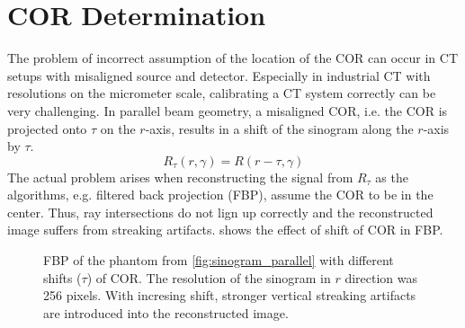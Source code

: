 \documentclass[10pt,journal,compsoc]{IEEEtran}
\begin{document}
\section{COR Determination}
The problem of incorrect assumption of the location of the COR can occur in CT setups with misaligned source and detector.
Especially in industrial CT with resolutions on the micrometer scale, calibrating a CT system correctly can be very challenging.
In parallel beam geometry, a misaligned COR, i.e. the COR is projected onto $\tau$ on the $r$-axis, results in a shift of the sinogram along the $r$-axis by $\tau$.
\begin{equation}
\label{eq:radonoffset}
R_\tau(r,\gamma) = R(r-\tau,\gamma)
\end{equation}
The actual problem arises when reconstructing the signal from $R_\tau$ as the algorithms, e.g. filtered back projection (FBP), assume the COR to be in the center.
Thus, ray intersections do not lign up correctly and the reconstructed image suffers from streaking artifacts.
 shows the effect of shift of COR in FBP.
%
\begin{figure}[!h]
\centering
{}
\hfil
{}
\hfil
{}
\hfil
{}
\caption{
FBP of the phantom from \cref{fig:sinogram_parallel} with different shifts ($\tau$) of COR.
The resolution of the sinogram in $r$ direction was 256 pixels.
With incresing shift, stronger vertical streaking artifacts are introduced into the reconstructed image.
}
\label{fig:shiftfbp}
\end{figure}
%
\end{document}
